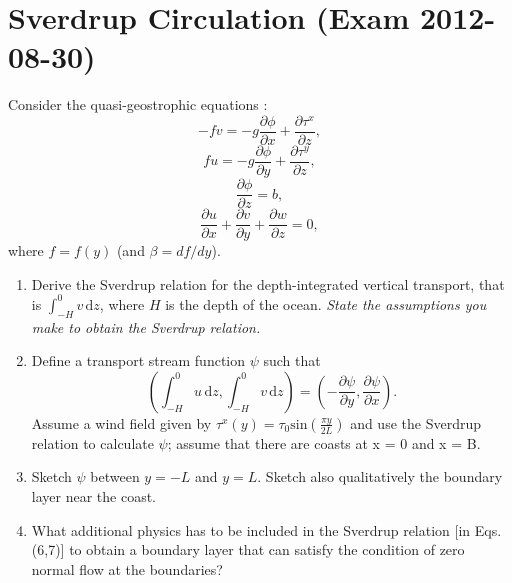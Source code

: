 \documentclass[a4paper,11pt]{article}
\begin{document}
\section{Sverdrup Circulation (Exam 2012-08-30)}
Consider the quasi-geostrophic equations :
\begin{equation}
-fv = -g\frac{\partial \phi}{\partial x} + \frac{\partial \tau^{x}}{\partial z},
\end{equation}
\begin{equation}
fu = -g\frac{\partial \phi}{\partial y} + \frac{\partial \tau^{y}}{\partial z},
\end{equation}
\begin{equation}
\frac{\partial \phi}{\partial z} = b,
\end{equation}
\begin{equation}
\frac{\partial u}{\partial x} + \frac{\partial v}{\partial y} + \frac{\partial w}{\partial z} = 0,
\end{equation}
where $f = f(y)$ (and $\beta = df/dy$).
\begin{enumerate}
\item Derive the Sverdrup relation for the depth-integrated vertical transport, that is  $\int_{-H}^{0} v \, \mathrm{d}z$, where $H$ is the depth of the ocean. \textit{State the assumptions you make to obtain the Sverdrup relation.}
\item Define a transport stream function $\psi$ such that
\begin{equation}
\left(\int_{-H}^{0} u \, \mathrm{d}z,\int_{-H}^{0} v \, \mathrm{d}z\right) = \left(-\frac{\partial \psi}{\partial y}, \frac{\partial \psi}{\partial x}\right).
\end{equation}
Assume a wind field given by $\tau^{x}(y) = \tau_{0} \text{sin}(\frac{\pi y}{2L})$ and use the Sverdrup relation to calculate $\psi$; assume that there are coasts at x = 0 and x = B.
\item Sketch $\psi$ between $y = -L$ and $y = L$. Sketch also qualitatively the boundary layer near the coast.
\item What additional physics has to be included in the Sverdrup relation [in Eqs. (6,7)] to obtain a boundary layer that can satisfy the condition of zero normal flow at the boundaries?
\end{enumerate}
\end{document}
